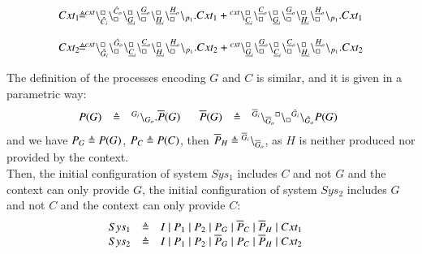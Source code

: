 \[
\begin{array}{l@{\hspace{-0.03cm}}c@{\hspace{-0.03cm}}l}
Cxt_1 & \defeq &\startchain{cxt}\chainedlink{\hat{C}_i}{\noact}\chainedlink{\noact}{\hat{C}_o}\chainedlink{\underline{G}_i}{\noact}\chainedlink{\noact}{\underline{G}_o}
\chainedlink{\underline{H}_i}{\noact}\chainedlink{\noact}{\underline{H}_o}\chainend{p_1}.Cxt_1 			                      +
                              \startchain{cxt}\chainedlink{\underline{C}_i}{\noact}\chainedlink{\noact}{\underline{C}_o}\chainedlink{\underline{G}_i}{\noact}\chainedlink{\noact}{\underline{G}_o}\chainedlink{\underline{H}_i}{\noact}\chainedlink{\noact}{\underline{H}_o}\chainend{p_1}.Cxt_1 \\
                              \\
                              Cxt_2 & \defeq &\startchain{cxt}\chainedlink{\hat{G}_i}{\noact}\chainedlink{\noact}{\hat{G}_o}\chainedlink{\underline{C}_i}{\noact}\chainedlink{\noact}{\underline{C}_o}\chainedlink{\underline{H}_i}{\noact}\chainedlink{\noact}{\underline{H}_o}\chainend{p_1}.Cxt_2 	                      +
                              \startchain{cxt}\chainedlink{\underline{G}_i}{\noact}\chainedlink{\noact}{\underline{G}_o}\chainedlink{\underline{C}_i}{\noact}\chainedlink{\noact}{\underline{C}_o}\chainedlink{\underline{H}_i}{\noact}\chainedlink{\noact}{\underline{H}_o}\chainend{p_1}.Cxt_2
\end{array}
\]

The definition of the processes encoding $G$ and $C$ is similar, and it is given in a parametric way:
\[
\begin{array}{lcl @{\hspace{0.5cm}}lcl}
P(G) &\defeq&\link{G_i}{G_o}.\overline{P}(G)\   & \overline{P}(G)&\defeq&\link{\overline{G}_i}{\overline{G}_o} \link{\noact}{\noact}\link{\tilde{G}_i}{\tilde{G}_o}P(G) \ \ 			                      
\end{array}
\]
and we have $P_G \triangleq P(G)$, $P_C \triangleq P(C)$,  then $\overline{P}_H \triangleq {}^{\overline{G}_i} \backslash_{\overline{G}_o} $, as $H$ is neither produced nor provided by the context.\\
Then, the initial configuration of system $Sys_1$ includes $C$ and not $G$ and the context can only provide $G$,
the initial configuration of system $Sys_2$ includes $G$ and not $C$ and the context can only provide $C$:
\[
\begin{array}{lcl@{\hspace{0.5cm}}lcl}
Sys_1 & \defeq & I\mid  P_1 \mid P_2 \mid P_G \mid \overline{P}_C \mid \overline{P}_H\mid Cxt_1 \\
Sys_2 & \defeq & I \mid P_1 \mid P_2 \mid \overline{P}_G \mid P_C \mid \overline{P}_H\mid Cxt_2\\
\end{array}
\]



